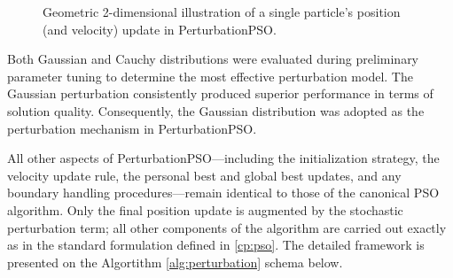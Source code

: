 {\begin{figure}[H]
    \caption[Geometric illustration of PerturbationPSO's position (and velocity) update]{Geometric 2-dimensional illustration of a single particle's position (and velocity) update in PerturbationPSO.}
    \label{fig:PerturbationPSO_geometric_illustration}
\end{figure}


Both Gaussian and Cauchy distributions were evaluated during preliminary parameter tuning to determine the most effective perturbation model. The Gaussian perturbation consistently produced superior performance in terms of solution quality. Consequently, the Gaussian distribution was adopted as the perturbation mechanism in PerturbationPSO.

All other aspects of PerturbationPSO—including the initialization strategy, the velocity update rule, the personal best and global best updates, and any boundary handling pro\-ce\-dures---remain identical to those of the canonical PSO algorithm. Only the final position update is augmented by the stochastic perturbation term; all other components of the algorithm are carried out exactly as in the standard formulation defined in \autoref{cp:pso}. The  detailed framework is presented on the Algortithm \ref{alg:perturbation} schema below.

}
